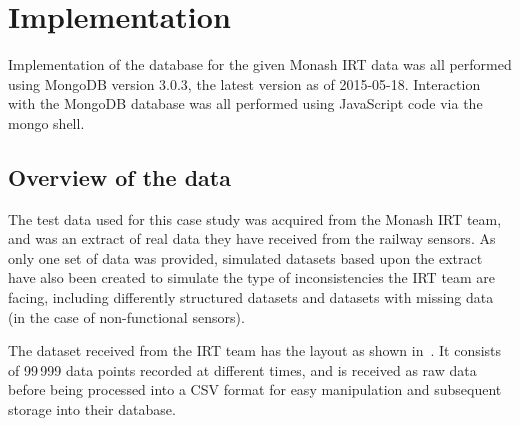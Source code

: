 \documentclass[a4paper,11pt]{article}
\begin{document}





\newpage

\section{Implementation} %
\label{sec:implementation}

Implementation of the database for the given Monash IRT data was all performed using MongoDB version 3.0.3, the latest
version as of 2015-05-18. Interaction with the MongoDB database was all performed using JavaScript code via the mongo shell.

\subsection{Overview of the data} %
\label{sub:overview_of_the_data}

The test data used for this case study was acquired from the Monash IRT team, and was an extract of real data they have
received from the railway sensors. As only one set of data was provided, simulated datasets based upon the extract have
also been created to simulate the type of inconsistencies the IRT team are facing, including differently structured
datasets and datasets with missing data (in the case of non-functional sensors).

The dataset received from the IRT team has the layout as shown in~. It consists of 99\,999 data points
recorded at different times, and is received as raw data before being processed into a CSV format for easy manipulation
and subsequent storage into their database.
\end{document}
